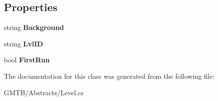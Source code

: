 \subsection*{Properties}
\begin{DoxyCompactItemize}
\item 
\mbox{\label{class_g_m_t_b_1_1_abstracts_1_1_level_a439001226a15ab69595def2ee288f3ce}} 
string {\bfseries Background}
\item 
\mbox{\label{class_g_m_t_b_1_1_abstracts_1_1_level_adbba7ac00e5ff29172bc648ab6b37f2c}} 
string {\bfseries Lvl\+ID}
\item 
\mbox{\label{class_g_m_t_b_1_1_abstracts_1_1_level_a270766fed7ba35f331507d1e2ce61e40}} 
bool {\bfseries First\+Run}
\end{DoxyCompactItemize}


The documentation for this class was generated from the following file\+:\begin{DoxyCompactItemize}
\item 
G\+M\+T\+B/\+Abstracts/Level.\+cs\end{DoxyCompactItemize}
